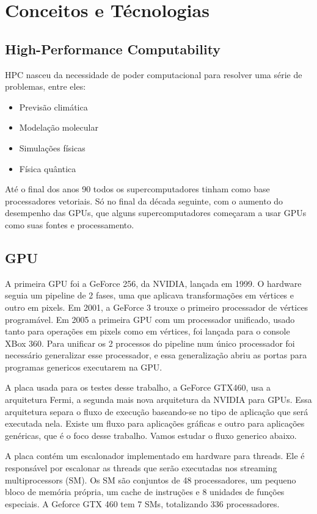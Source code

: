 \section{Conceitos e Técnologias}
\subsection{High-Performance Computability}
HPC nasceu da necessidade de poder computacional para resolver uma série de problemas, entre eles:
\begin{itemize}
  \item Previsão climática
  \item Modelação molecular
  \item Simulações físicas
  \item Física quântica
\end{itemize}
Até o final dos anos 90 todos os supercomputadores tinham como base processadores vetoriais. Só no final da década seguinte, 
com o aumento do desempenho das GPUs, que alguns supercomputadores começaram a usar GPUs como suas fontes e processamento.
\subsection{GPU}
A primeira GPU foi a GeForce 256, da NVIDIA, lançada em 1999. O hardware seguia um pipeline de 2 fases, uma que aplicava transformações
em vértices e outro em pixels. Em 2001, a GeForce 3 trouxe o primeiro processador de vértices programável. Em 2005 a primeira
GPU com um processador unificado, usado tanto para operações em pixels como em vértices, foi lançada para o console XBox 360. 
Para unificar os 2 processos do pipeline num único processador foi necessário generalizar esse processador, e essa generalização
abriu as portas para programas genericos executarem na GPU.

A placa usada para os testes desse trabalho, a GeForce GTX460, usa a arquitetura Fermi, a segunda mais nova arquitetura da NVIDIA para
GPUs. Essa arquitetura separa o fluxo de execução baseando-se no tipo de aplicação que será executada nela. Existe um fluxo para
aplicações gráficas e outro para aplicações genéricas, que é o foco desse trabalho. Vamos estudar o fluxo generico abaixo.

A placa contém um escalonador implementado em hardware para threads. Ele é responsável por escalonar as threads que serão
executadas nos streaming multiprocessors (SM). Os SM são conjuntos de 48 processadores, um pequeno bloco de memória própria,
um cache de instruções e 8 unidades de funções especiais. A Geforce GTX 460 tem 7 SMs, totalizando 336 processadores.

